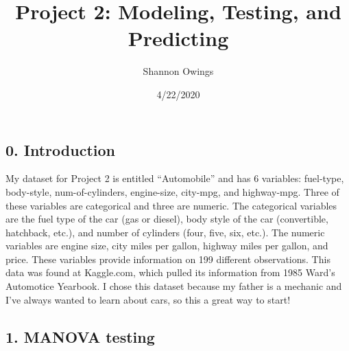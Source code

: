 \documentclass[]{article}
\title{Project 2: Modeling, Testing, and Predicting}
\author{Shannon Owings}
\date{4/22/2020}
\begin{document}
\maketitle

\subsection{0. Introduction}\label{introduction}

My dataset for Project 2 is entitled ``Automobile'' and has 6 variables:
fuel-type, body-style, num-of-cylinders, engine-size, city-mpg, and
highway-mpg. Three of these variables are categorical and three are
numeric. The categorical variables are the fuel type of the car (gas or
diesel), body style of the car (convertible, hatchback, etc.), and
number of cylinders (four, five, six, etc.). The numeric variables are
engine size, city miles per gallon, highway miles per gallon, and price.
These variables provide information on 199 different observations. This
data was found at Kaggle.com, which pulled its information from 1985
Ward's Automotice Yearbook. I chose this dataset because my father is a
mechanic and I've always wanted to learn about cars, so this a great way
to start!

\subsection{1. MANOVA testing}\label{manova-testing}
\end{document}
